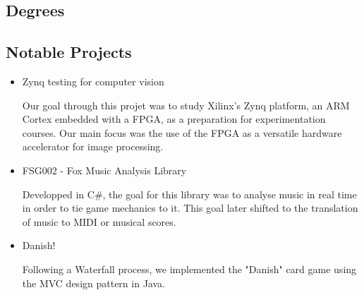 \documentclass[11pt,a4paper,sans]{moderncv}        %
\begin{document}
\subsection{Degrees}

\vspace{5pt}


{}


\vspace{2pt}

\subsection{Notable Projects}

\vspace{5pt}

\begin{itemize}

\item{Zynq testing for computer vision}

\vspace{3pt}

\small{Our goal through this projet was to study Xilinx's Zynq platform, an ARM Cortex embedded with a FPGA, as a preparation for experimentation courses. Our main focus was the use of the FPGA as a versatile hardware accelerator for image processing.}

\vspace{6pt}

\item{FSG002 - Fox Music Analysis Library}

\vspace{3pt}

\small{Developped in C#, the goal for this library was to analyse music in real time in order to tie game mechanics to it. This goal later shifted to the translation of music to MIDI or musical scores.}

\vspace{6pt}

\item{Danish!}

\vspace{3pt}

\small{Following a Waterfall process, we implemented the "Danish" card game using the MVC design pattern in Java.}

\end{itemize}
\newpage
\end{document}
